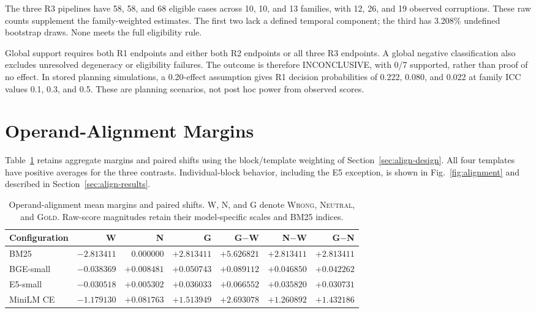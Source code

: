 \documentclass[conference,letterpaper]{IEEEtran}
\newcommand{\wrong}{\textsc{Wrong}}
\newcommand{\neutral}{\textsc{Neutral}}
\newcommand{\gold}{\textsc{Gold}}
\begin{document}
The three R3 pipelines have 58, 58, and 68 eligible cases across 10, 10, and 13 families, with 12, 26, and 19 observed corruptions. These raw counts supplement the family-weighted estimates. The first two lack a defined temporal component; the third has 3.208\% undefined bootstrap draws. None meets the full eligibility rule.

Global support requires both R1 endpoints and either both R2 endpoints or all three R3 endpoints. A global negative classification also excludes unresolved degeneracy or eligibility failures. The outcome is therefore INCONCLUSIVE, with 0/7 supported, rather than proof of no effect. In stored planning simulations, a 0.20-effect assumption gives R1 decision probabilities of 0.222, 0.080, and 0.022 at family ICC values 0.1, 0.3, and 0.5. These are planning scenarios, not post hoc power from observed scores.


\section{Operand-Alignment Margins}\label{app:margins}
Table~\ref{tab:margins} retains aggregate margins and paired shifts using the block/template weighting of Section~\ref{sec:align-design}. All four templates have positive averages for the three contrasts. Individual-block behavior, including the E5 exception, is shown in Fig.~\ref{fig:alignment} and described in Section~\ref{sec:align-results}.
\begin{table}[t]
\caption{Operand-alignment mean margins and paired shifts. W, N, and G denote \wrong, \neutral, and \gold. Raw-score magnitudes retain their model-specific scales and BM25 indices.}
\label{tab:margins}
\centering\small
\begin{tabular}{lrrrrrr}
\toprule
Configuration & W & N & G & G$-$W & N$-$W & G$-$N \\
\midrule
BM25 & $-2.813411$ & $0.000000$ & $+2.813411$ & $+5.626821$ & $+2.813411$ & $+2.813411$ \\
BGE-small & $-0.038369$ & $+0.008481$ & $+0.050743$ & $+0.089112$ & $+0.046850$ & $+0.042262$ \\
E5-small & $-0.030518$ & $+0.005302$ & $+0.036033$ & $+0.066552$ & $+0.035820$ & $+0.030731$ \\
MiniLM CE & $-1.179130$ & $+0.081763$ & $+1.513949$ & $+2.693078$ & $+1.260892$ & $+1.432186$ \\
\bottomrule
\end{tabular}
\end{table}
\end{document}
